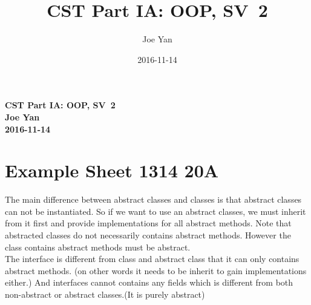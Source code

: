 \documentclass[10pt,twoside,a4paper]{article}
\newcommand{\studentname}{Joe Yan}
\newcommand{\svworkdate}{2016-11-14}
\newcommand{\svcourse}{CST Part IA: OOP}
\newcommand{\svnumber}{2}
\begin{document}
\author{\studentname}
\title{\svcourse, SV~\svnumber}
\date{\svworkdate}

\textbf{\svcourse, SV~\svnumber}\\
\textbf{\studentname}\\
\textbf{\svworkdate}\\

\section{Example Sheet 1314 20A}
The main difference between abstract classes and classes is that abstract classes can not be instantiated. So if we want to use an abstract classes, we must inherit from it first and provide implementations for all abstract methods. Note that abstracted classes do not necessarily contains abstract methods. However the class contains abstract methods must be abstract.\\
The interface is different from class and abstract class that it can only contains abstract methods. (on other words it needs to be inherit to gain implementations either.) And interfaces cannot contains any fields which is different from both non-abstract or abstract classes.(It is purely abstract)
\end{document}
